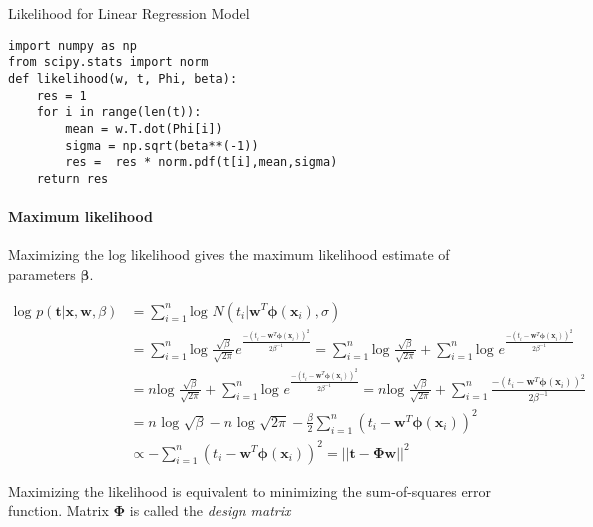 \documentclass[a4paper,10pt]{article}
\begin{document}
\begin{algorithm}
  \caption{Likelihood for Linear Regression Model}
  \label{alg:likelihood_for_linear_regression_model}
\begin{lstlisting}
import numpy as np
from scipy.stats import norm 
def likelihood(w, t, Phi, beta):
    res = 1
    for i in range(len(t)):
        mean = w.T.dot(Phi[i])
        sigma = np.sqrt(beta**(-1))
        res =  res * norm.pdf(t[i],mean,sigma)
    return res
\end{lstlisting}
\end{algorithm}


\paragraph{Maximum likelihood}

Maximizing the log likelihood gives the maximum likelihood estimate of parameters $\bm{\beta}$.

\begin{equation}\label{eq:maximum_likelihood}
 \begin{split}
   \text{log } p(\bm{t} | \bm{x}, \bm{w}, \beta) & = \sum_{i=1}^{n} \text{log } N(t_i | \bm{w}^T \bm{\phi}(\bm{x}_i), \sigma)  \\
  & =  \sum_{i=1}^{n} \text{log }  \frac{\sqrt{\beta} }{\sqrt{2\pi}} e^{\frac{-(t_i - \bm{w}^T\bm{\phi}(\bm{x}_i))^2}{2\beta^{-1}} } = \sum_{i=1}^{n} \text{log } \frac{\sqrt{\beta} }{\sqrt{2\pi}} + \sum_{i=1}^{n} \text{log } e^{\frac{-(t_i - \bm{w}^T\bm{\phi}(\bm{x}_i))^2}{2\beta^{-1}} } \\
  & = n \text{log } \frac{\sqrt{\beta} }{\sqrt{2\pi}} + \sum_{i=1}^{n} \text{log } e^{\frac{-(t_i - \bm{w}^T\bm{\phi}(\bm{x}_i))^2}{2\beta^{-1}} } = n \text{log } \frac{\sqrt{\beta} }{\sqrt{2\pi}} + \sum_{i=1}^{n}  \frac{-(t_i - \bm{w}^T\bm{\phi}(\bm{x}_i))^2}{2\beta^{-1}} \\
   &  = n \text{ log } \sqrt{\beta} - n \text{ log } \sqrt{2\pi} - \frac{\beta}{2} \sum_{i=1}^{n}  (t_i - \bm{w}^T\bm{\phi}(\bm{x}_i))^2   \\
  & \propto  - \sum_{i=1}^{n}  (t_i - \bm{w}^T\bm{\phi}(\bm{x}_i))^2 = ||\bm{t}-\bm{\Phi}\bm{w}||^2
 \end{split}
\end{equation}

Maximizing the likelihood is equivalent to minimizing the sum-of-squares error function.
Matrix $\bm{\Phi}$ is called the \emph{design matrix}
\end{document}
